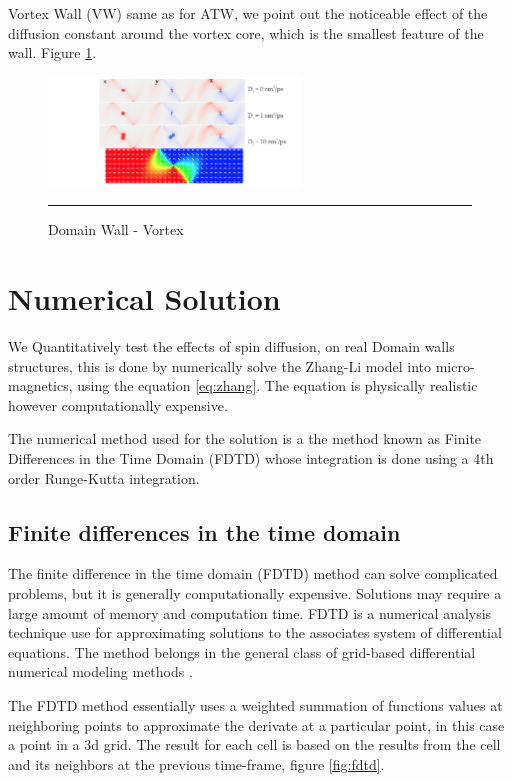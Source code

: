 Vortex Wall (VW) same as for ATW, we point out the noticeable effect of the diffusion constant around the vortex core, which is the smallest feature of the wall. Figure \ref{fig:vw}.

\begin{figure}[htbp]
	\centering
		\includegraphics[width=0.6\textwidth]{Figures/VW.png}
		\rule{35em}{0.5pt}
	\caption[Domain Wall - Vortex]{Domain Wall - Vortex}
	\label{fig:vw}
\end{figure}

\section{Numerical Solution}

We Quantitatively test the effects of spin diffusion, on real Domain walls structures, this is done by numerically solve the Zhang-Li model into micro-magnetics, using the equation \ref{eq:zhang}. The equation is physically realistic however computationally expensive.

The numerical method used for the solution is a the method known as Finite Differences in the Time Domain (FDTD) whose integration is done using a 4th order Runge-Kutta integration.

\subsection{Finite differences in the time domain}

The finite difference in the time domain (FDTD) method can solve complicated problems, but it is generally computationally expensive. Solutions may require a large amount of memory and computation time.  FDTD is a numerical analysis technique use for approximating solutions to the associates system of differential equations. The method belongs in the general class of grid-based differential numerical modeling methods \cite{methods}.

The FDTD method essentially uses a weighted summation of functions values at neighboring points to approximate the derivate at a particular point, in this case a point in a 3d grid. The result for each cell is based on the results from the cell and its neighbors at the previous time-frame, figure \ref{fig:fdtd}.  

